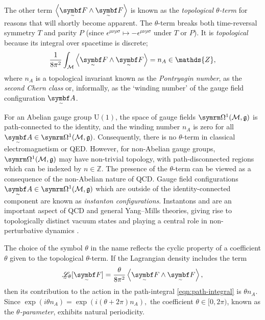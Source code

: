 The other term $\ang{\tsbm F \wedge \tsbm F}$ is known as the \emph{topological $\theta$-term} for reasons that will shortly become apparent.
The $\theta$-term breaks both time-reversal symmetry $T$ and parity $P$ (since $\epsilon^{\mu\nu\rho\sigma} \mapsto -\epsilon^{\mu\nu\rho\sigma}$ under $T$ or $P$).
It is \emph{topological} because its integral over spacetime is discrete;
\begin{align}
	\frac{1}{8\pi^2}\int_{\cal M} \ang{\tsbm F \wedge \tsbm F} = n_A \in \mathds{Z}
,\end{align}
where $n_A$ is a topological invariant known as the \emph{Pontryagin number}, as the \emph{second Chern class} \cite[§\,1]{Witten_1989} or, informally, as the `winding number' \cite[§\,2.2]{Tong_lecture_notes} of the gauge field configuration $\tsbm A$.



For an Abelian gauge group $\mathrm{U}(1)$, the space of gauge fields $\forms^1(\cal M, \mathfrak g)$ is path-connected to the identity, and the winding number $n_A$ is zero for all $\tsbm A \in \forms^1(\cal M, \mathfrak g)$.
Consequently, there is no $\theta$-term in classical electromagnetism or QED.
However, for non-Abelian gauge groups, $\forms^1(\cal M, \mathfrak g)$ may have non-trivial topology, with path-disconnected regions which can be indexed by $n \in \mathds{Z}$.
The presence of the $\theta$-term can be viewed as a consequence of the non-Abelian nature of QCD.
Gauge field configurations $\tsbm A \in \forms^1(\cal M, \mathfrak g)$ which are outside of the identity-connected component are known as \emph{instanton configurations}.
Instantons and are an important aspect of QCD and general Yang--Mills theories, giving rise to topologically distinct vacuum states and playing a central role in non-perturbative dynamics \cite{lectures-on-instantons}.

The choice of the symbol $\theta$ in the name reflects the cyclic property of a coefficient $\theta$ given to the topological $\theta$-term.
If the Lagrangian density includes the term
\begin{align}
	\LL_\theta[\tsbm F] = \frac{\theta}{8\pi^2}\ang{\tsbm F\wedge\tsbm F}
,\end{align}
then its contribution to the action in the path-integral \eqref{eqn:path-integral} is $\theta n_A$.
Since
\begin{math}
	\exp(i\theta n_A) = \exp(i(\theta + 2\pi)n_A)
,\end{math}
the coefficient $\theta \in [0, 2\pi)$, known as the \emph{$\theta$-parameter}, exhibits natural periodicity.




